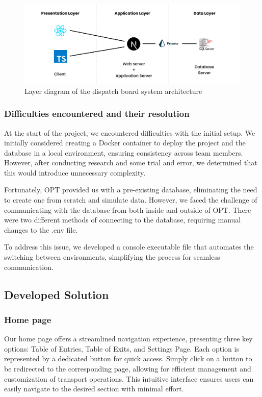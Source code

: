 \documentclass[10pt]{article}
\begin{document}
        \begin{figure}[!ht]
            \centering
            \includegraphics[width=1\textwidth]{architecture_diagram}
            \caption{Layer diagram of the dispatch board system architecture}
            \label{fig:architecture_diagram}
        \end{figure}

        \subsubsection{Difficulties encountered and their resolution}
        At the start of the project, we encountered difficulties with the initial setup. We initially considered creating a Docker container to deploy the project and the database in a local environment, ensuring consistency across team members. However, after conducting research and some trial and error, we determined that this would introduce unnecessary complexity.

        Fortunately, OPT provided us with a pre-existing database, eliminating the need to create one from scratch and simulate data. However, we faced the challenge of communicating with the database from both inside and outside of OPT. There were two different methods of connecting to the database, requiring manual changes to the .env file.

        To address this issue, we developed a console executable file that automates the switching between environments, simplifying the process for seamless communication.
        \subsection{Developed Solution}

        \subsubsection{Home page}

        Our home page offers a streamlined navigation experience, presenting three key options: Table of Entries, Table of Exits, and Settings Page. Each option is represented by a dedicated button for quick access. Simply click on a button to be redirected to the corresponding page, allowing for efficient management and customization of transport operations. This intuitive interface ensures users can easily navigate to the desired section with minimal effort.
\end{document}
